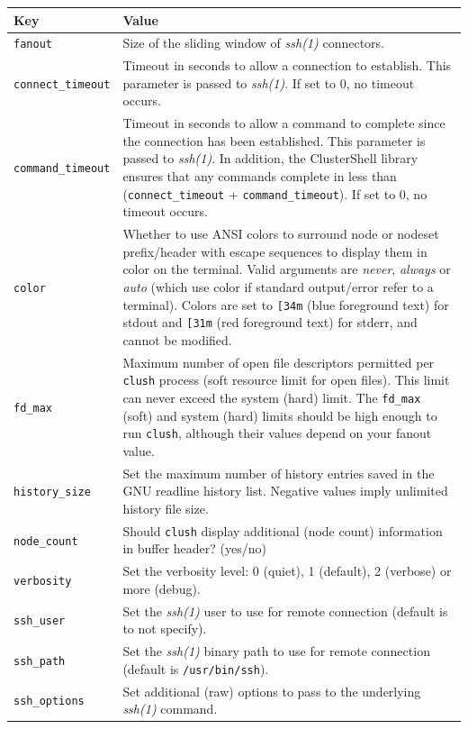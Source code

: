 \documentclass[english,a4paper]{csuserguide}
\newcommand{\clush}{\texttt{clush}\xspace}
\begin{document}
\begin{center}
\begin{tabular}{|p{3.2cm}|p{12.8cm}|} 
\hline 
\textbf{Key} & \textbf{Value} \\
\hline
\verb+fanout+& Size of the sliding window of \textit{ssh(1)} connectors.\\
\hline
\verb+connect_timeout+ & Timeout  in  seconds  to  allow a connection to establish. This parameter is passed to \textit{ssh(1)}. If set to 0, no timeout occurs.\\
\hline
\verb+command_timeout+ & Timeout in seconds to allow a command to complete since the connection has been established. This parameter is passed to \textit{ssh(1)}.  In addition, the ClusterShell library ensures that any commands complete in less than (\verb+connect_timeout+ + \verb+command_timeout+). If set to 0, no timeout occurs.\\
\hline
\verb+color+ & Whether  to  use  ANSI  colors  to  surround node or nodeset prefix/header with escape sequences to display them in color on the terminal. Valid arguments are \textit{never},  \textit{always} or \textit{auto} (which use color if standard output/error refer to a terminal). Colors are set to \verb+[34m+ (blue foreground text) for stdout and \verb+[31m+ (red foreground text)  for  stderr, and cannot be modified.\\
\hline
\verb+fd_max+ & Maximum  number  of  open  file descriptors permitted per \clush process (soft resource limit for open files). This limit can never exceed the system (hard) limit. The \verb+fd_max+ (soft)  and  system  (hard)  limits should be high enough to run \clush, although their values depend on your fanout value.\\
\hline
\verb+history_size+ & Set the maximum number of history entries saved in the GNU readline history list. Negative values imply unlimited history file size.\\
\hline
\verb+node_count+ & Should \clush display additional (node count) information in buffer header? (yes/no)\\
\hline
\verb+verbosity+ & Set the verbosity level: 0 (quiet), 1 (default), 2 (verbose) or more (debug).\\
\hline
\verb+ssh_user+ & Set the \textit{ssh(1)} user to use for remote connection (default is to not specify).\\
\hline
\verb+ssh_path+ & Set the \textit{ssh(1)} binary path to use for remote connection (default is \verb+/usr/bin/ssh+).\\
\hline
\verb+ssh_options+ & Set additional (raw) options to pass to the underlying \textit{ssh(1)} command.\\
\hline
\end{tabular}
\end{center}
\end{document}
